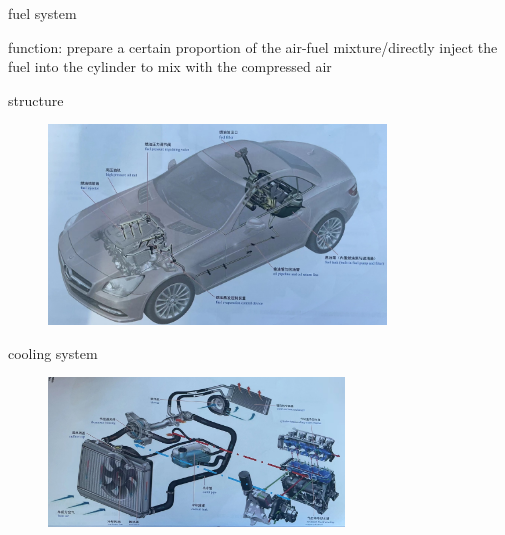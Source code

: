 \begin{frame}
	\begin{block}{fuel system}
		\begin{compactitem}
			\item function: prepare a certain proportion of the air-fuel mixture/directly inject the fuel into the cylinder to mix with the compressed air
			\item structure
				\begin{figure}[htbp]
					\centering
					\includegraphics[width=0.8\textwidth]{2-7}
				\end{figure}
		\end{compactitem}
	\end{block}
\end{frame}
\begin{frame}
	\begin{block}{cooling system}
		\begin{figure}[htbp]
			\centering
			\includegraphics[width=0.7\textwidth]{2-11}
		\end{figure}
	\end{block}
\end{frame}
